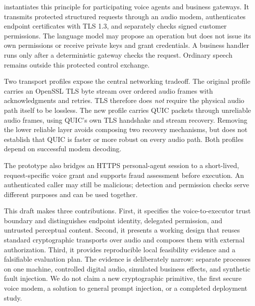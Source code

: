\sys{} instantiates this principle for participating voice agents and business
gateways. It transmits protected structured requests through an audio modem,
authenticates endpoint certificates with TLS 1.3, and separately checks signed
customer permissions. The language model may propose an operation but does not
issue its own permissions or receive private keys and grant credentials. A
business handler runs only after a deterministic gateway checks the request.
Ordinary speech remains outside this protected control exchange.

Two transport profiles expose the central networking tradeoff. The original
profile carries an OpenSSL TLS byte stream over ordered audio frames with
acknowledgments and retries. TLS therefore does \emph{not} require the physical
audio path itself to be lossless. The new profile carries QUIC packets through
unreliable audio frames, using QUIC's own TLS handshake and stream recovery.
Removing the lower reliable layer avoids composing two recovery mechanisms,
but does not establish that QUIC is faster or more robust on every audio path.
Both profiles depend on successful modem decoding.

The prototype also bridges an HTTPS personal-agent session to a short-lived,
request-specific voice grant and supports fraud assessment before execution.
An authenticated caller may still be malicious; detection and permission checks
serve different purposes and can be used together.

This draft makes three contributions. First, it specifies the voice-to-executor
trust boundary and distinguishes endpoint identity, delegated permission, and
untrusted perceptual content. Second, it presents a working design that reuses
standard cryptographic transports over audio and composes them with external
authorization. Third, it provides reproducible local feasibility evidence and
a falsifiable evaluation plan. The evidence is deliberately narrow: separate
processes on one machine, controlled digital audio, simulated business effects,
and synthetic fault injection. We do not claim a new cryptographic primitive,
the first secure voice modem, a solution to general prompt injection, or a
completed deployment study.
